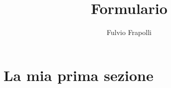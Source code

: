 \documentclass{article}
\title{Formulario}
\author{Fulvio Frapolli}
\begin{document}
\maketitle

\section{La mia prima sezione}
\end{document}
